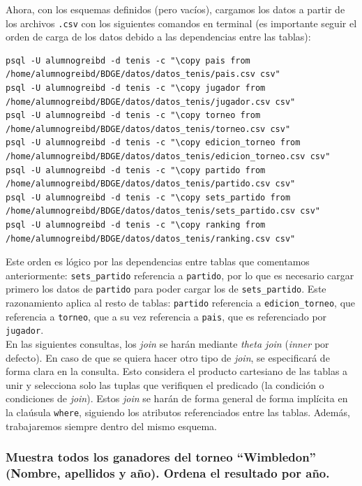 \documentclass[11pt]{opticajnl}
\begin{document}
Ahora, con los esquemas definidos (pero vacíos), cargamos los datos a partir de los archivos \texttt{.csv} con los siguientes comandos en terminal (es importante seguir el orden de carga de los datos debido a las dependencias entre las tablas):

\begin{lstlisting}[style=terminal]
psql -U alumnogreibd -d tenis -c "\copy pais from /home/alumnogreibd/BDGE/datos/datos_tenis/pais.csv csv"
psql -U alumnogreibd -d tenis -c "\copy jugador from /home/alumnogreibd/BDGE/datos/datos_tenis/jugador.csv csv"
psql -U alumnogreibd -d tenis -c "\copy torneo from /home/alumnogreibd/BDGE/datos/datos_tenis/torneo.csv csv"
psql -U alumnogreibd -d tenis -c "\copy edicion_torneo from /home/alumnogreibd/BDGE/datos/datos_tenis/edicion_torneo.csv csv"
psql -U alumnogreibd -d tenis -c "\copy partido from /home/alumnogreibd/BDGE/datos/datos_tenis/partido.csv csv"
psql -U alumnogreibd -d tenis -c "\copy sets_partido from /home/alumnogreibd/BDGE/datos/datos_tenis/sets_partido.csv csv"
psql -U alumnogreibd -d tenis -c "\copy ranking from /home/alumnogreibd/BDGE/datos/datos_tenis/ranking.csv csv"
\end{lstlisting}

Este orden es lógico por las dependencias entre tablas que comentamos anteriormente: \texttt{sets\_partido} referencia a \texttt{partido}, por lo que es necesario cargar primero los datos de \texttt{partido} para poder cargar los de \texttt{sets\_partido}. Este razonamiento aplica al resto de tablas: \texttt{partido} referencia a \texttt{edicion\_torneo}, que referencia a \texttt{torneo}, que a su vez referencia a \texttt{pais}, que es referenciado por \texttt{jugador}. \\

En las siguientes consultas, los \textit{join} se harán mediante \textit{theta join} (\textit{inner} por defecto). En caso de que se quiera hacer otro tipo de \textit{join}, se especificará de forma clara en la consulta. Esto considera el producto cartesiano de las tablas a unir y selecciona solo las tuplas que verifiquen el predicado (la condición o condiciones de \textit{join}). Estos \textit{join} se harán de forma general de forma implícita en la claúsula \texttt{where}, siguiendo los atributos referenciados entre las tablas. Además, trabajaremos siempre dentro del mismo esquema. \\


\subsubsection{Muestra todos los ganadores del torneo ``Wimbledon'' (Nombre, apellidos y año). Ordena el resultado por año.}
\end{document}
